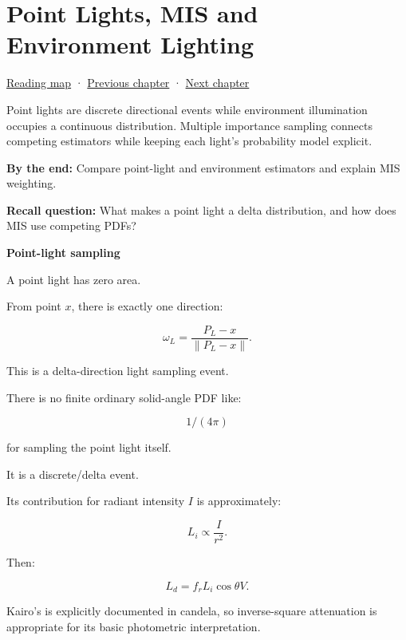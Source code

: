\chapter{Point Lights, MIS and Environment Lighting}\label{03-visual-computing-i-ch009-point-lights-mis-and-environment-lighting}\hypertarget{03-visual-computing-i-ch009}{}\label{stagechapter:03-visual-computing-i-ch009}

\hypertarget{03-visual-computing-i-ch009-point-lights-mis-and-environment-lighting}{}

\hyperref[volume-reading-map]{Reading map} · \hyperref[03-visual-computing-i-ch008-sampling-directions-and-light-transport]{Previous chapter} · \hyperref[03-visual-computing-i-ch010-a-production-path-tracer-media-randomness-and-validation]{Next chapter}

Point lights are discrete directional events while environment illumination occupies a continuous distribution. Multiple importance sampling connects competing estimators while keeping each light's probability model explicit.

\textbf{By the end:} Compare point-light and environment estimators and explain MIS weighting.

\textbf{Recall question:} What makes a point light a delta distribution, and how does MIS use competing PDFs?

\textbf{Point-light sampling}

A point light has zero area.

From point \(x\), there is exactly one direction:

\[
\omega_L
=
\frac{
P_L-x
}{
\|P_L-x\|
}.
\]

This is a delta-direction light sampling event.

There is no finite ordinary solid-angle PDF like:

\[
1/(4\pi)
\]

for sampling the point light itself.

It is a discrete/delta event.

Its contribution for radiant intensity \(I\) is approximately:

\[
L_i
\propto
\frac{
I
}{
r^2
}.
\]

Then:

\[
L_d
=
f_r
L_i
\cos\theta
V.
\]

Kairo's  is explicitly documented in candela, so inverse-square attenuation is appropriate for its basic photometric interpretation.

